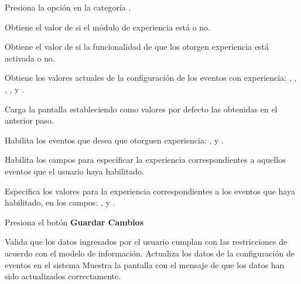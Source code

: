 \begin{UCtrayectoria}%
%
   

  \Actor Presiona la opción {\bf{}} en la categoría
         . 

  \Sistema Obtiene el valor de si el módulo de experiencia está  o no.  \label{CU-E02-3-activated}

  \Sistema Obtiene el valor de si la funcionalidad de que los  otorgen experiencia está activada o no.
            \label{CU-E02-3-events}

  \Sistema Obtiene los valores actuales de la configuración de los eventos con experiencia:
           ,
           ,
           ,
           ,
            y
           .

  \Sistema Carga la pantalla  estableciendo como valores por defecto
           las  obtenidas en el anterior paso.

  \Actor Habilita los eventos que desea que otorguen experiencia:
           ,
            y
           .

  \Sistema Habilita los campos para especificar la experiencia correspondientes a aquellos
           eventos que el usuario haya habilitado.

  \Actor Especifica los valores para la experiencia correspondientes a los eventos que haya
         habilitado, en los campos:
           ,
            y
           .

  \Actor Presiona el botón {\bf Guardar Cambios}  \label{CU-E02-3-submit}

  \Sistema Valida que los datos ingresados por el usuario cumplan con las restricciones
           de acuerdo con el modelo de información. 
  \Sistema Actualiza los datos de la configuración de eventos en el sistema
  \Sistema Muestra la pantalla  con el mensaje de que los datos han sido
           actualizados correctamente.

\end{UCtrayectoria}


